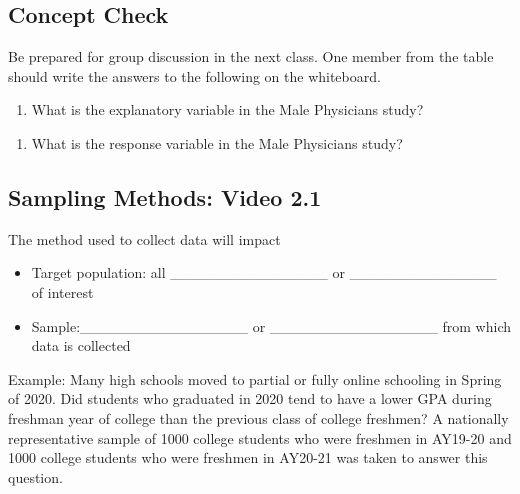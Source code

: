 \documentclass[
]{report}
\providecommand{\tightlist}{%
  \setlength{\itemsep}{0pt}\setlength{\parskip}{0pt}}
\begin{document}

\subsection{Concept Check}\label{concept-check}

Be prepared for group discussion in the next class. One member from the table should write the answers to the following on the whiteboard.

\begin{enumerate}
\def\labelenumi{\arabic{enumi}.}
\tightlist
\item
  What is the explanatory variable in the Male Physicians study?
\end{enumerate}

\vspace{0.4in}

\begin{enumerate}
\def\labelenumi{\arabic{enumi}.}
\setcounter{enumi}{1}
\tightlist
\item
  What is the response variable in the Male Physicians study?
\end{enumerate}

\vspace{0.4in}


\subsection*{Sampling Methods: Video 2.1}\label{sampling-methods-video-2.1}


The method used to collect data will impact

\begin{itemize}
\item
  Target population: all \_\_\_\_\_\_\_\_\_\_\_\_\_\_\_ or \_\_\_\_\_\_\_\_\_\_\_\_\_\_ of interest
\item
  Sample:\_\_\_\_\_\_\_\_\_\_\_\_\_\_\_\_ or \_\_\_\_\_\_\_\_\_\_\_\_\_\_\_\_ from which data is collected
\end{itemize}


Example: Many high schools moved to partial or fully online schooling in Spring of 2020. Did students who graduated in 2020 tend to have a lower GPA during freshman year of college than the previous class of college freshmen? A nationally representative sample of 1000 college students who were freshmen in AY19-20 and 1000 college students who were freshmen in AY20-21 was taken to answer this question.
\end{document}
